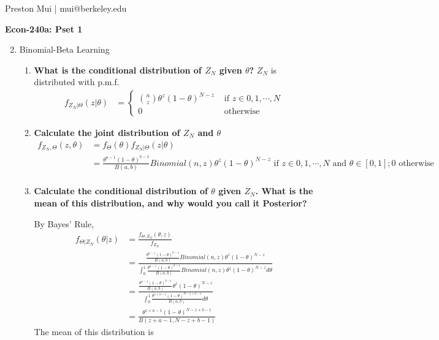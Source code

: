 \documentclass{article}[12pt]
\begin{document}
\begin{center}
	Preston Mui | mui@berkeley.edu

	{\bf Econ-240a: Pset 1}
\end{center}


\begin{enumerate}
\setcounter{enumi}{1}

	\item Binomial-Beta Learning
	\begin{enumerate}[(1)]
		\item \textbf{What is the conditional distribution of $Z_N$ given $\theta$?}
		$Z_N$ is distributed with p.m.f.
		\begin{align*}
		    f_{Z_N | \Theta}(z | \theta) &= \begin{cases}
		    \binom{n}{z} \theta^z (1-\theta)^{N - z} &\mbox{ if $z \in 0, 1, \cdots, N$} \\
		    0 &\mbox{ otherwise}
		    \end{cases}
		\end{align*}

	\item \textbf{Calculate the joint distribution of $Z_N$ and $\theta$}
	\begin{align*}
	    f_{Z_N,\Theta}(z,\theta) &= f_{\Theta}(\theta) f_{Z_N | \Theta}(z|\theta) \\
	    &= \frac{\theta^{a-1}(1-\theta)^{b-1}}{B(a,b)} Binomial(n,z) \theta^z (1-\theta)^{N - z} \mbox{ if $z \in 0, 1, \cdots, N$ and $\theta \in [0,1]$}; 0 \mbox{ otherwise} \\
	\end{align*}

	\item \textbf{Calculate the conditional distribution of $\theta$ given $Z_N$. What is the mean of this distribution, and why would you call it Posterior?}

	By Bayes' Rule,
	\begin{align*}
	    f_{\Theta | Z_N}(\theta | z) &= \frac{f_{\Theta, Z_N}(\theta,z)}{f_{Z_N}}\\
	    &= \frac{\frac{\theta^{a-1}(1-\theta)^{b-1}}{B(a,b)} Binomial(n,z) \theta^z (1-\theta)^{N - z}}{\int_{0}^{1} \frac{\theta^{a-1}(1-\theta)^{b-1}}{B(a,b)} Binomial(n,z) \theta^z (1-\theta)^{N - z} d\theta}\\
	    &= \frac{\frac{\theta^{a-1}(1-\theta)^{b-1}}{B(a,b)} \theta^z (1-\theta)^{N - z}}{\int_{0}^{1} \frac{\theta^{z+a-1}(1-\theta)^{N-z+b-1}}{B(a,b)} d\theta} \\
	    &= \frac{\theta^{z+a-1}(1-\theta)^{N-z+b-1}}{B(z+a-1,N-z+b-1)}
	\end{align*}
	The mean of this distribution is


\end{enumerate}
\end{enumerate}
\end{document}
